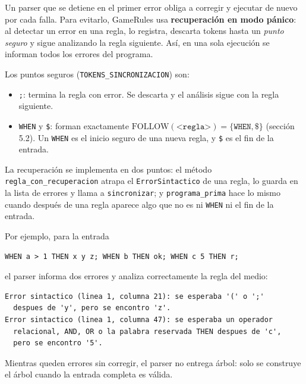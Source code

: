 Un parser que se detiene en el primer error obliga a corregir y ejecutar de nuevo por cada falla. Para evitarlo, GameRules usa \textbf{recuperación en modo pánico}: al detectar un error en una regla, lo registra, descarta tokens hasta un \emph{punto seguro} y sigue analizando la regla siguiente. Así, en una sola ejecución se informan todos los errores del programa.

Los puntos seguros (\texttt{TOKENS\_SINCRONIZACION}) son:

\begin{itemize}
    \item \texttt{;}: termina la regla con error. Se descarta y el análisis sigue con la regla siguiente.
    \item \texttt{WHEN} y \texttt{\$}: forman exactamente $\text{FOLLOW}(\texttt{<regla>}) = \{\texttt{WHEN}, \$\}$ (sección 5.2). Un \texttt{WHEN} es el inicio seguro de una nueva regla, y \texttt{\$} es el fin de la entrada.
\end{itemize}

La recuperación se implementa en dos puntos: el método \texttt{regla\_con\_recuperacion} atrapa el \texttt{ErrorSintactico} de una regla, lo guarda en la lista de errores y llama a \texttt{sincronizar}; y \texttt{programa\_prima} hace lo mismo cuando después de una regla aparece algo que no es ni \texttt{WHEN} ni el fin de la entrada.

Por ejemplo, para la entrada

\begin{lstlisting}
WHEN a > 1 THEN x y z; WHEN b THEN ok; WHEN c 5 THEN r;
\end{lstlisting}

el parser informa dos errores y analiza correctamente la regla del medio:

\begin{lstlisting}
Error sintactico (linea 1, columna 21): se esperaba '(' o ';'
  despues de 'y', pero se encontro 'z'.
Error sintactico (linea 1, columna 47): se esperaba un operador
  relacional, AND, OR o la palabra reservada THEN despues de 'c',
  pero se encontro '5'.
\end{lstlisting}

Mientras queden errores sin corregir, el parser no entrega árbol: solo se construye el árbol cuando la entrada completa es válida.

\newpage
